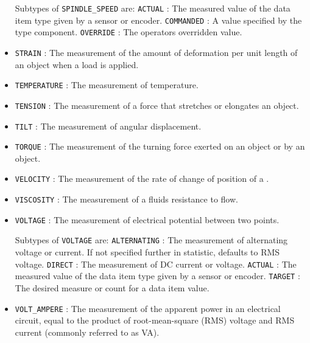 \begin{itemize}
Subtypes of \texttt{SPINDLE_SPEED} are: 
\newline\tab \texttt{ACTUAL} : The measured value of the data item type given by a sensor or encoder. 
\newline\tab \texttt{COMMANDED} : A value specified by the  type component. 
\newline\tab \texttt{OVERRIDE} : The operators overridden value. 
\item \texttt{STRAIN} : The measurement of the amount of deformation per unit length of an object when a load is applied. 

\item \texttt{TEMPERATURE} : The measurement of temperature. 

\item \texttt{TENSION} : The measurement of a force that stretches or elongates an object. 

\item \texttt{TILT} : The measurement of angular displacement. 

\item \texttt{TORQUE} : The measurement of the turning force exerted on an object or by an object. 

\item \texttt{VELOCITY} : The measurement of the rate of change of position of a . 

\item \texttt{VISCOSITY} : The measurement of a fluids resistance to flow. 

\item \texttt{VOLTAGE} : The measurement of electrical potential between two points. 

Subtypes of \texttt{VOLTAGE} are: 
\newline\tab \texttt{ALTERNATING} : The measurement of alternating voltage or current.   If not specified further in statistic, defaults to RMS voltage.  
\newline\tab \texttt{DIRECT} : The measurement of DC current or voltage. 
\newline\tab \texttt{ACTUAL} : The measured value of the data item type given by a sensor or encoder. 
\newline\tab \texttt{TARGET} : The desired measure or count for a data item value. 
\item \texttt{VOLT_AMPERE} : The measurement of the apparent power in an electrical circuit, equal to the product of root-mean-square (RMS) voltage and RMS current (commonly referred to as VA). 


\end{itemize}
